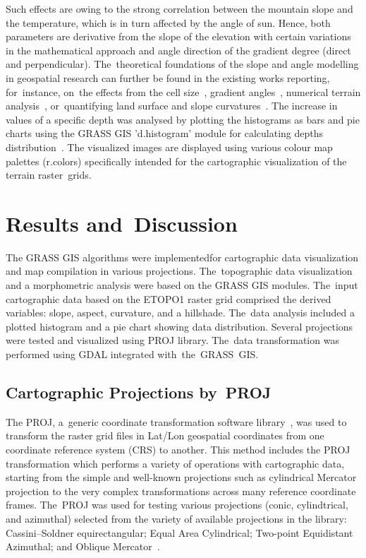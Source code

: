 \documentclass[technologies,article,accept,pdftex,moreauthors]{Definitions/mdpi}
\begin{document}
Such effects are owing to the strong correlation between the mountain slope and the temperature, which is in turn affected by the angle of sun. Hence, both parameters are derivative from the slope of the elevation with certain variations in the mathematical approach and angle direction of the gradient degree (direct and perpendicular). The~theoretical foundations of the slope and angle modelling in geospatial research can further be found in the existing works reporting, for~instance, on~the effects from the cell size~\cite{Hodgson1995}, gradient angles~\cite{Hodgson1998}, numerical terrain analysis~\cite{Zevenbegen}, or~quantifying land surface and slope curvatures~\cite{Dikau,Dunn,Guth,Heerdegan}. {The increase in values of a specific depth} was {analysed} by plotting the histograms as bars and pie charts using the GRASS GIS 'd.histogram' module for calculating depths distribution~\cite{Mitasovaetal1995}. {The visualized }images are displayed using various colour map palettes (r.colors) specifically intended for the cartographic visualization of the terrain raster~grids. 

\section{Results and~Discussion}
{The} GRASS GIS algorithms {were implemented}for cartographic data visualization and map{ compilation} in various projections. The~topographic data visualization and a morphometric analysis were based {on} the {GRASS GIS} modules. The~input cartographic data {based on} the ETOPO1 raster grid {comprised} the derived variables: slope, aspect, curvature, and a hillshade. The~data analysis included a plotted histogram and a pie chart showing data distribution. Several projections were tested and visualized using PROJ library. The~data transformation was performed using GDAL integrated \mbox{with the GRASS~GIS}. 

\subsection{{Cartographic} Projections by~PROJ}

{The} PROJ, a~generic coordinate transformation software library~\cite{EversKnudsen}, {was used }to transform the raster grid files in Lat/Lon geospatial coordinates from one coordinate reference system (CRS) to another. This method includes the PROJ transformation which performs a variety of operations with cartographic data, starting from the simple and well-known projections such as cylindrical Mercator projection to the very complex transformations across many reference coordinate frames. The~PROJ was used for testing various projections (conic, cylindtrical, and azimuthal) selected from the variety of available projections in the library: Cassini--Soldner equirectangular; Equal Area Cylindrical; Two-point Equidistant Azimuthal; and Oblique Mercator~\cite{Snyder}. 
\end{document}
